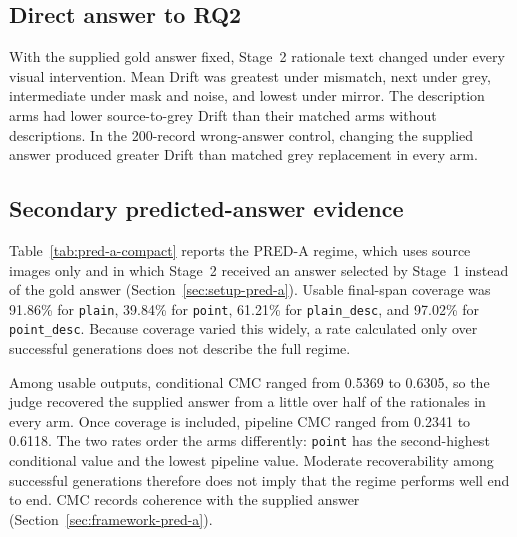 \subsection{Direct answer to RQ2}
\label{sec:results-rq2-answer}

\begin{samepage}
With the supplied gold answer fixed, Stage~2 rationale text changed under every
visual intervention. Mean Drift was greatest under mismatch, next under grey,
intermediate under mask and noise, and lowest under mirror. The description arms
had lower source-to-grey Drift than their matched arms without descriptions. In the
200-record wrong-answer control, changing the supplied answer produced greater Drift
than matched grey replacement in every arm.
\end{samepage}

\subsection{Secondary predicted-answer evidence}
\label{sec:results-pred-a}

Table~\ref{tab:pred-a-compact} reports the PRED-A regime, which uses source
images only and in which Stage~2 received an answer selected by Stage~1 instead
of the gold answer (Section~\ref{sec:setup-pred-a}). Usable final-span coverage
was 91.86\% for \texttt{plain}, 39.84\% for \texttt{point}, 61.21\% for
\texttt{plain\_desc}, and 97.02\% for \texttt{point\_desc}. Because coverage
varied this widely, a rate calculated only over successful generations does not
describe the full regime.

Among usable outputs, conditional CMC ranged from 0.5369 to 0.6305, so the judge
recovered the supplied answer from a little over half of the rationales in every
arm. Once coverage is included, pipeline CMC ranged from 0.2341 to 0.6118. The
two rates order the arms differently: \texttt{point} has the second-highest
conditional value and the lowest pipeline value. Moderate recoverability among
successful generations therefore does not imply that the regime performs well
end to end. CMC records coherence with the supplied answer
(Section~\ref{sec:framework-pred-a}).

\begingroup
\let\table\inplacetable
\let\endtable\endinplacetable

\endgroup

